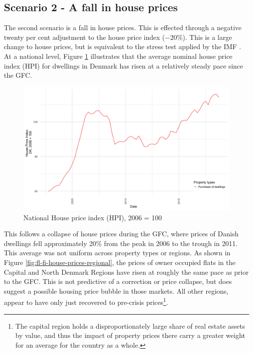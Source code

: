 \documentclass[
]{book}
\begin{document}
\hypertarget{sec:fi-fl-sfc-scenarios-s2}{%
\subsection{Scenario 2 - A fall in house prices}\label{sec:fi-fl-sfc-scenarios-s2}}

The second scenario is a fall in house prices. This is effected through a negative twenty per cent adjustment to the house price index (\(-20\%\)). This is a large change to house prices, but is equivalent to the stress test applied by the IMF \citep{sheehy2014}. At a national level, Figure \ref{fig:fl-fi-house-prices-national} illustrates that the average nominal house price index (HPI) for dwellings in Denmark has risen at a relatively steady pace since the GFC.

\begin{figure}[H]
\includegraphics[width=0.7\linewidth]{figures/fl-fi-house-prices-national-1} \caption{National House price index (HPI), 2006 = 100}\label{fig:fl-fi-house-prices-national}
\end{figure}

This follows a collapse of house prices during the GFC, where prices of Danish dwellings fell approximately 20\% from the peak in 2006 to the trough in 2011. This average was not uniform across property types or regions. As shown in Figure \ref{fig:fl-fi-house-prices-regional}, the prices of owner occupied flats in the Capital and North Denmark Regions have risen at roughly the same pace as prior to the GFC. This is not predictive of a correction or price collapse, but does suggest a possible housing price bubble in those markets. All other regions, appear to have only just recovered to pre-crisis prices\footnote{The capital region holds a disproportionately large share of real estate assets by value, and thus the impact of property prices there carry a greater weight for an average for the country as a whole.}.
\end{document}
